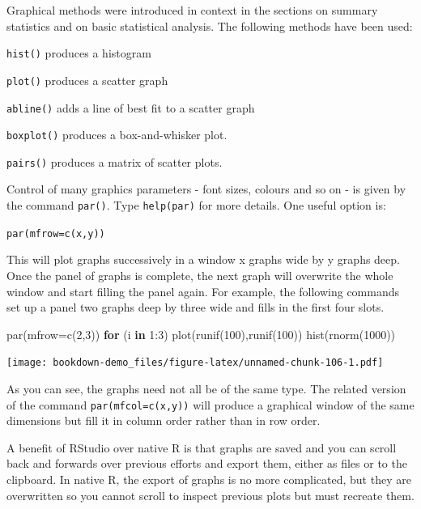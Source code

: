 \documentclass[
]{book}
\newenvironment{Shaded}{\begin{snugshade}}{\end{snugshade}}
\newcommand{\AttributeTok}[1]{\textcolor[rgb]{0.77,0.63,0.00}{#1}}
\newcommand{\ControlFlowTok}[1]{\textcolor[rgb]{0.13,0.29,0.53}{\textbf{#1}}}
\newcommand{\DecValTok}[1]{\textcolor[rgb]{0.00,0.00,0.81}{#1}}
\newcommand{\FunctionTok}[1]{\textcolor[rgb]{0.00,0.00,0.00}{#1}}
\newcommand{\NormalTok}[1]{#1}
\newcommand{\SpecialCharTok}[1]{\textcolor[rgb]{0.00,0.00,0.00}{#1}}
\begin{document}
Graphical methods were introduced in context in the sections on summary statistics and on basic statistical analysis. The following methods have been used:

\texttt{hist()} produces a histogram

\texttt{plot()} produces a scatter graph

\texttt{abline()} adds a line of best fit to a scatter graph

\texttt{boxplot()} produces a box-and-whisker plot.

\texttt{pairs()} produces a matrix of scatter plots.

Control of many graphics parameters - font sizes, colours and so on - is given by the command \texttt{par()}. Type \texttt{help(par)} for more details. One useful option is:

\texttt{par(mfrow=c(x,y))}

This will plot graphs successively in a window x graphs wide by y graphs deep. Once the panel of graphs is complete, the next graph will overwrite the whole window and start filling the panel again. For example, the following commands set up a panel two graphs deep by three wide and fills in the first four slots.

\begin{Shaded}
\begin{Highlighting}[]
\FunctionTok{par}\NormalTok{(}\AttributeTok{mfrow=}\FunctionTok{c}\NormalTok{(}\DecValTok{2}\NormalTok{,}\DecValTok{3}\NormalTok{))}
\ControlFlowTok{for}\NormalTok{ (i }\ControlFlowTok{in} \DecValTok{1}\SpecialCharTok{:}\DecValTok{3}\NormalTok{) }\FunctionTok{plot}\NormalTok{(}\FunctionTok{runif}\NormalTok{(}\DecValTok{100}\NormalTok{),}\FunctionTok{runif}\NormalTok{(}\DecValTok{100}\NormalTok{))}
\FunctionTok{hist}\NormalTok{(}\FunctionTok{rnorm}\NormalTok{(}\DecValTok{1000}\NormalTok{))}
\end{Highlighting}
\end{Shaded}

\texttt{[image: bookdown-demo\_files/figure-latex/unnamed-chunk-106-1.pdf]}

As you can see, the graphs need not all be of the same type. The related version of the command \texttt{par(mfcol=c(x,y))} will produce a graphical window of the same dimensions but fill it in column order rather than in row order.

A benefit of RStudio over native R is that graphs are saved and you can scroll back and forwards over previous efforts and export them, either as files or to the clipboard. In native R, the export of graphs is no more complicated, but they are overwritten so you cannot scroll to inspect previous plots but must recreate them.
\end{document}
